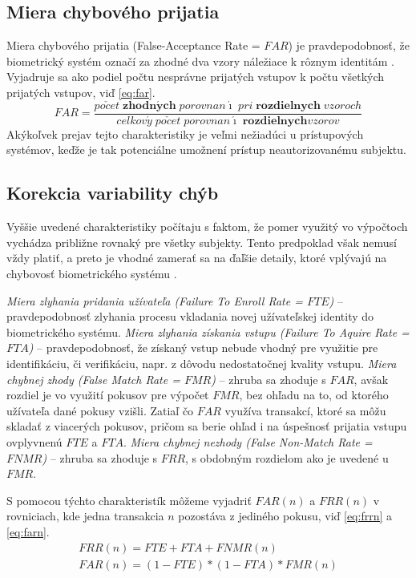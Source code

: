 \subsection{Miera chybového prijatia}
Miera chybového prijatia (False-Acceptance Rate = $FAR$) je pravdepodobnosť, že biometrický systém označí za zhodné dva vzory náležiace k rôznym identitám \cite{bio3}. Vyjadruje sa ako podiel počtu nesprávne prijatých vstupov k počtu všetkých prijatých vstupov, viď \ref{eq:far}.
\begin{equation}\label{eq:far}
FAR = \frac{po\check{c}et \; \mathbf{zhodn\acute{y}ch} \; porovnan\acute{\imath} \; pri \; \mathbf{rozdielnych} \; vzoroch}{celkov\acute{y} \; po\check{c}et \; porovnan\acute{\imath} \; \mathbf{rozdielnych} vzorov}
\end{equation}
Akýkoľvek prejav tejto charakteristiky je veľmi nežiadúci u prístupových systémov, keďže je tak potenciálne umožnení prístup neautorizovanému subjektu.

\subsection{Korekcia variability chýb}
Vyššie uvedené charakteristiky počítaju s faktom, že pomer využitý vo výpočtoch vychádza približne rovnaký pre všetky subjekty. Tento predpoklad však nemusí vždy platiť, a preto je vhodné zamerať sa na ďaľšie detaily, ktoré vplývajú na chybovosť biometrického systému \cite{bio3}.

\emph{Miera zlyhania pridania užívateľa (Failure To Enroll Rate = $FTE$)} -- pravdepodobnosť zlyhania procesu vkladania novej užívateľskej identity do biometrického systému.
\emph{Miera zlyhania získania vstupu (Failure To Aquire Rate = $FTA$)} -- pravdepodobnosť, že získaný vstup nebude vhodný pre využitie pre identifikáciu, či verifikáciu, napr. z dôvodu nedostatočnej kvality vstupu.
\emph{Miera chybnej zhody (False Match Rate = $FMR$)} -- zhruba sa zhoduje s $FAR$, avšak rozdiel je vo využití pokusov pre výpočet $FMR$, bez ohľadu na to, od ktorého užívateľa dané pokusy vzišli. Zatiaľ čo $FAR$ využíva transakcí, ktoré sa môžu skladať z viacerých pokusov, pričom sa berie ohľad i na úspešnosť prijatia vstupu ovplyvnenú $FTE$ a $FTA$.
\emph{Miera chybnej nezhody (False Non-Match Rate = $FNMR$)} -- zhruba sa zhoduje s $FRR$, s obdobným rozdielom ako je uvedené u $FMR$.

S pomocou týchto charakteristík môžeme vyjadriť $FAR(n)$ a $FRR(n)$ v rovniciach, kde jedna transakcia $n$ pozostáva z jediného pokusu, viď \ref{eq:frrn} a \ref{eq:farn}.
\begin{align}
FRR(n) = FTE + FTA + FNMR(n) \label{eq:frrn} \\
FAR(n) = (1-FTE) * (1-FTA) * FMR(n) \label{eq:farn}
\end{align}

